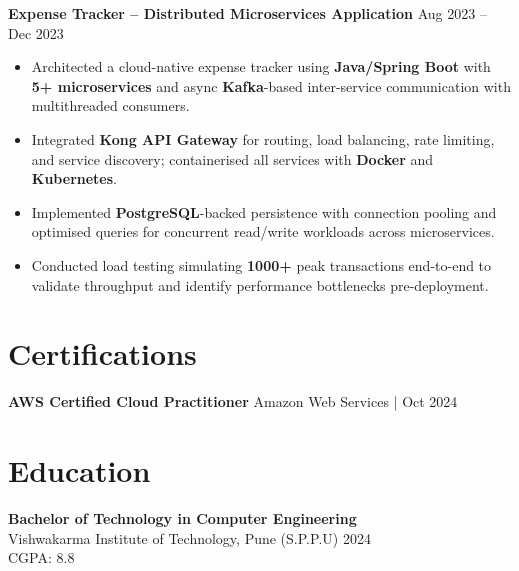 \documentclass[a4paper,10pt]{article}
\begin{document}
\textbf{Expense Tracker -- Distributed Microservices Application} \hfill Aug 2023 -- Dec 2023
\begin{itemize}[leftmargin=*]
    \item Architected a cloud-native expense tracker using \textbf{Java/Spring Boot} with \textbf{5+ microservices} and async \textbf{Kafka}-based inter-service communication with multithreaded consumers.
    \item Integrated \textbf{Kong API Gateway} for routing, load balancing, rate limiting, and service discovery; containerised all services with \textbf{Docker} and \textbf{Kubernetes}.
    \item Implemented \textbf{PostgreSQL}-backed persistence with connection pooling and optimised queries for concurrent read/write workloads across microservices.
    \item Conducted load testing simulating \textbf{1000+} peak transactions end-to-end to validate throughput and identify performance bottlenecks pre-deployment.
\end{itemize}

\section*{Certifications}
\textbf{AWS Certified Cloud Practitioner} \hfill Amazon Web Services \;|\; Oct 2024 \\

\section*{Education}

\textbf{Bachelor of Technology in Computer Engineering} \\
Vishwakarma Institute of Technology, Pune (S.P.P.U) \hfill 2024 \\
CGPA: 8.8

    
\end{document}
